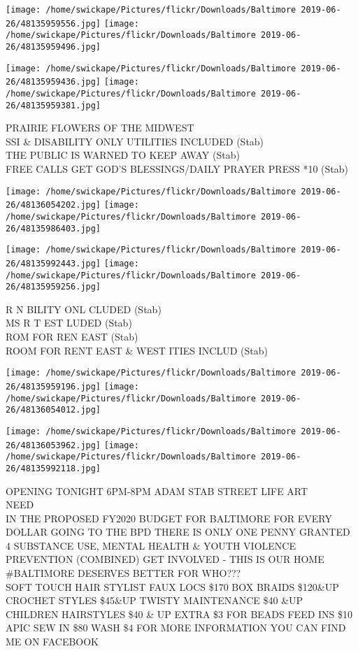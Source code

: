 \documentclass[10pt,letterpaper]{article}
\begin{document}
\texttt{[image: /home/swickape/Pictures/flickr/Downloads/Baltimore 2019-06-26/48135959556.jpg]}
\texttt{[image: /home/swickape/Pictures/flickr/Downloads/Baltimore 2019-06-26/48135959496.jpg]}

\texttt{[image: /home/swickape/Pictures/flickr/Downloads/Baltimore 2019-06-26/48135959436.jpg]}
\texttt{[image: /home/swickape/Pictures/flickr/Downloads/Baltimore 2019-06-26/48135959381.jpg]}

PRAIRIE FLOWERS OF THE MIDWEST\\
SSI \& DISABILITY ONLY UTILITIES INCLUDED (Stab)\\
THE PUBLIC IS WARNED TO KEEP AWAY (Stab)\\
FREE CALLS GET GOD'S BLESSINGS/DAILY PRAYER PRESS *10 (Stab)
\pagebreak

\texttt{[image: /home/swickape/Pictures/flickr/Downloads/Baltimore 2019-06-26/48136054202.jpg]}
\texttt{[image: /home/swickape/Pictures/flickr/Downloads/Baltimore 2019-06-26/48135986403.jpg]}

\texttt{[image: /home/swickape/Pictures/flickr/Downloads/Baltimore 2019-06-26/48135992443.jpg]}
\texttt{[image: /home/swickape/Pictures/flickr/Downloads/Baltimore 2019-06-26/48135959256.jpg]}

R N BILITY ONL CLUDED (Stab)\\
MS R T EST LUDED (Stab)\\
ROM FOR REN EAST (Stab)\\
ROOM FOR RENT EAST \& WEST ITIES INCLUD (Stab)
\pagebreak

\texttt{[image: /home/swickape/Pictures/flickr/Downloads/Baltimore 2019-06-26/48135959196.jpg]}
\texttt{[image: /home/swickape/Pictures/flickr/Downloads/Baltimore 2019-06-26/48136054012.jpg]}

\texttt{[image: /home/swickape/Pictures/flickr/Downloads/Baltimore 2019-06-26/48136053962.jpg]}
\texttt{[image: /home/swickape/Pictures/flickr/Downloads/Baltimore 2019-06-26/48135992118.jpg]}

OPENING TONIGHT 6PM{-}8PM ADAM STAB STREET LIFE ART\\
NEED\\
IN THE PROPOSED FY2020 BUDGET FOR BALTIMORE FOR EVERY DOLLAR GOING TO THE BPD THERE IS ONLY ONE PENNY GRANTED 4 SUBSTANCE USE, MENTAL HEALTH \& YOUTH VIOLENCE PREVENTION (COMBINED) GET INVOLVED {-} THIS IS OUR HOME \#BALTIMORE DESERVES BETTER FOR WHO???\\
SOFT TOUCH HAIR STYLIST FAUX LOCS \$170 BOX BRAIDS \$120\&UP CROCHET STYLES \$45\&UP TWISTY MAINTENANCE \$40 \&UP CHILDREN HAIRSTYLES \$40 \& UP EXTRA \$3 FOR BEADS FEED INS \$10 APIC SEW IN \$80 WASH \$4 FOR MORE INFORMATION YOU CAN FIND ME ON FACEBOOK
\pagebreak
\end{document}
